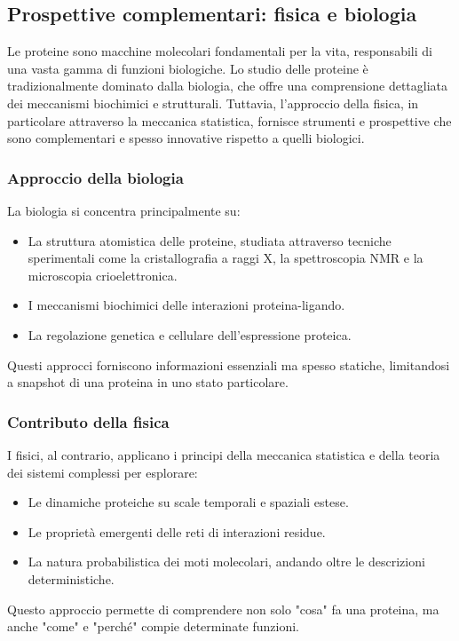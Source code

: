\documentclass[Lau,binding=0.6cm,oneside,noexaminfo]{sapthesis}
\begin{document}
\subsection{Prospettive complementari: fisica e biologia}
Le proteine sono macchine molecolari fondamentali per la vita, responsabili di una vasta gamma di funzioni biologiche. Lo studio delle proteine è tradizionalmente dominato dalla biologia, che offre una comprensione dettagliata dei meccanismi biochimici e strutturali. Tuttavia, l'approccio della fisica, in particolare attraverso la meccanica statistica, fornisce strumenti e prospettive che sono complementari e spesso innovative rispetto a quelli biologici.

\subsubsection{Approccio della biologia}
La biologia si concentra principalmente su:
\begin{itemize}
    \item La struttura atomistica delle proteine, studiata attraverso tecniche sperimentali come la cristallografia a raggi X, la spettroscopia NMR e la microscopia crioelettronica.
    \item I meccanismi biochimici delle interazioni proteina-ligando.
    \item La regolazione genetica e cellulare dell'espressione proteica.
\end{itemize}
Questi approcci forniscono informazioni essenziali ma spesso statiche, limitandosi a snapshot di una proteina in uno stato particolare.

\subsubsection{Contributo della fisica}
I fisici, al contrario, applicano i principi della meccanica statistica e della teoria dei sistemi complessi per esplorare:
\begin{itemize}
    \item Le dinamiche proteiche su scale temporali e spaziali estese.
    \item Le proprietà emergenti delle reti di interazioni residue.
    \item La natura probabilistica dei moti molecolari, andando oltre le descrizioni deterministiche.
\end{itemize}
Questo approccio permette di comprendere non solo "cosa" fa una proteina, ma anche "come" e "perché" compie determinate funzioni.
\end{document}
